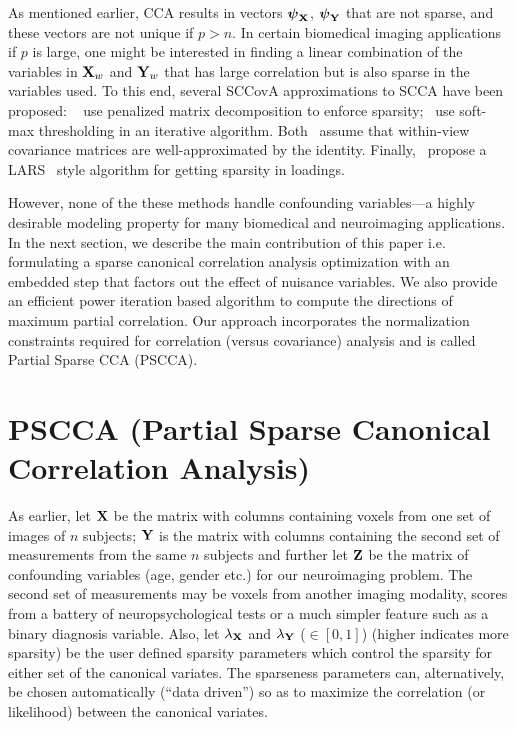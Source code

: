 \documentclass{llncs}
\newcommand{\X}{{\bf X}}
\newcommand{\Y}{{\bf Y}}
\newcommand{\Z}{{\bf Z}}
\newcommand{\bs}{\boldsymbol}
\begin{document}
As mentioned earlier, CCA results in vectors $\bs\psi_{\X}$,
$\bs\psi_{\Y}$ that are not sparse, and these vectors are not unique
if $p > n$. In certain biomedical imaging applications if $p$ is
large, one might be interested in finding a linear combination of the
variables in $\X_w$ and $\Y_w$ that has large correlation but is also
sparse in the variables used. To this end, several SCCovA
approximations to SCCA have been proposed: ~\cite{witten} use
penalized matrix decomposition to enforce sparsity;~\cite{parkhomenko}
use soft-max thresholding in an iterative algorithm.  Both~\cite{parkhomenko,witten} assume that
within-view covariance matrices are well-approximated by the
identity.  Finally,~\cite{lykou} propose a LARS~\cite{lars} style algorithm for getting sparsity in
loadings. 

However, none of the these methods handle confounding variables---a
highly desirable modeling property for many biomedical and
neuroimaging applications.  In the next section, we describe the main
contribution of this paper i.e. formulating a sparse canonical
correlation analysis optimization with an embedded step that factors
out the effect of nuisance variables.  We also provide an efficient
power iteration based algorithm to compute the directions of maximum
partial correlation. Our approach incorporates the normalization
constraints required for correlation (versus covariance) analysis and
is called Partial Sparse CCA (PSCCA).

\section{PSCCA (Partial Sparse Canonical Correlation Analysis)}
As earlier, let $\X$ be the matrix with columns containing voxels from one set of
images of $n$ subjects; $\Y$ is the matrix with columns containing
the second set of measurements from the same $n$ subjects and further
let $\Z$ be the matrix of confounding variables (age, gender etc.) for
our neuroimaging problem.  The second set of measurements may be
voxels from another imaging modality, scores from a battery of
neuropsychological tests or a much simpler feature such as a binary
diagnosis variable.  Also, let $\lambda_{\X}$ and $\lambda_{\Y}$ ($\in
[0,1]$) (higher indicates more sparsity) be the user defined sparsity
parameters which control the sparsity for either set of the canonical
variates.  The sparseness parameters can, alternatively, be chosen automatically (``data driven'') so as to maximize the correlation (or likelihood) between the canonical variates.
\end{document}
